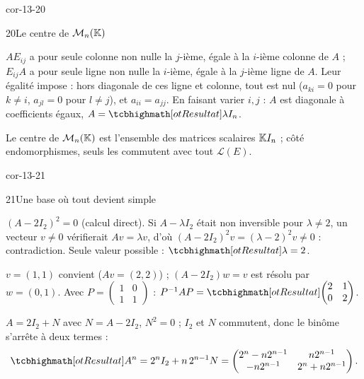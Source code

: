 \begin{blocLivre}{cor-13-20}
\begin{corrige}{20}{Le centre de $\mathcal{M}_n(\mathbb{K})$}
\begin{questions}
  \item $AE_{ij}$ a pour seule colonne non nulle la $j$-ième, égale à la
    $i$-ième colonne de $A$ ; $E_{ij}A$ a pour seule ligne non nulle la
    $i$-ième, égale à la $j$-ième ligne de $A$. Leur égalité impose :
    hors diagonale de ces ligne et colonne, tout est nul
    ($a_{ki}=0$ pour $k\neq i$, $a_{jl}=0$ pour $l\neq j$), et
    $a_{ii}=a_{jj}$. En faisant varier $i,j$ : $A$ est diagonale à
    coefficients égaux, $A=\res{\lambda I_n}$.
  \item Le centre de $\mathcal{M}_n(\mathbb{K})$ est l'ensemble des matrices
    scalaires $\mathbb{K} I_n$ ; côté endomorphismes, seuls les
     commutent avec tout $\mathcal{L}(E)$.
\end{questions}
\end{corrige}
\end{blocLivre}

\begin{blocLivre}{cor-13-21}
\begin{corrige}{21}{Une base où tout devient simple}
\begin{questions}
  \item $(A-2I_2)^{2}=0$ (calcul direct). Si $A-\lambda I_2$ était non
    inversible pour $\lambda\neq2$, un vecteur $v\neq0$ vérifierait
    $Av=\lambda v$, d'où $(A-2I_2)^{2}v=(\lambda-2)^{2}v\neq0$ :
    contradiction. Seule valeur possible : $\res{\lambda=2}$.
  \item $v=(1,1)$ convient ($Av=(2,2)$) ; $(A-2I_2)w=v$ est résolu par
    $w=(0,1)$. Avec $P=\begin{pmatrix}1&0\\1&1\end{pmatrix}$ :
    $P^{-1}AP=\res{\begin{pmatrix}2&1\\0&2\end{pmatrix}}$.
  \item $A=2I_2+N$ avec $N=A-2I_2$, $N^{2}=0$ ; $I_2$ et $N$ commutent,
    donc le binôme s'arrête à deux termes :
    \[
    \res{A^{n}=2^{n}I_2+n\,2^{n-1}N}
    =\begin{pmatrix}2^{n}-n2^{n-1}&n2^{n-1}\\-n2^{n-1}&2^{n}+n2^{n-1}\end{pmatrix}.
    \]
\end{questions}
\end{corrige}
\end{blocLivre}

